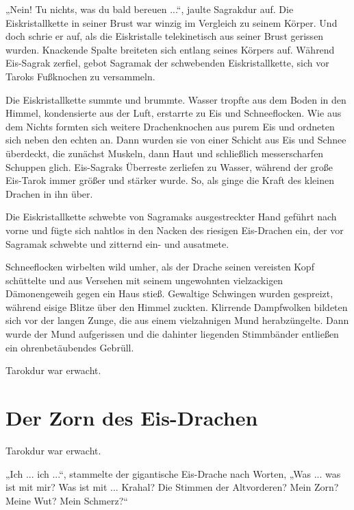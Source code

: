„Nein! Tu nichts, was du bald bereuen ...“, jaulte Sagrakdur auf. Die Eiskristallkette in seiner Brust war winzig im Vergleich zu seinem Körper. Und doch schrie er auf, als die Eiskristalle telekinetisch aus seiner Brust gerissen wurden. Knackende Spalte breiteten sich entlang seines Körpers auf. Während Eis-Sagrak zerfiel, gebot Sagramak der schwebenden Eiskristallkette, sich vor Taroks Fußknochen zu versammeln.

Die Eiskristallkette summte und brummte. Wasser tropfte aus dem Boden in den Himmel, kondensierte aus der Luft, erstarrte zu Eis und Schneeflocken. Wie aus dem Nichts formten sich weitere Drachenknochen aus purem Eis und ordneten sich neben den echten an. Dann wurden sie von einer Schicht aus Eis und Schnee überdeckt, die zunächst Muskeln, dann Haut und schließlich messerscharfen Schuppen glich. Eis-Sagraks Überreste zerliefen zu Wasser, während der große Eis-Tarok immer größer und stärker wurde. So, als ginge die Kraft des kleinen Drachen in ihn über.

Die Eiskristallkette schwebte von Sagramaks ausgestreckter Hand geführt nach vorne und fügte sich nahtlos in den Nacken des riesigen Eis-Drachen ein, der vor Sagramak schwebte und zitternd ein- und ausatmete.

Schneeflocken wirbelten wild umher, als der Drache seinen vereisten Kopf schüttelte und aus Versehen mit seinem ungewohnten vielzackigen Dämonengeweih gegen ein Haus stieß. Gewaltige Schwingen wurden gespreizt, während eisige Blitze über den Himmel zuckten. Klirrende Dampfwolken bildeten sich vor der langen Zunge, die aus einem vielzahnigen Mund herabzüngelte. Dann wurde der Mund aufgerissen und die dahinter liegenden Stimmbänder entließen ein ohrenbetäubendes Gebrüll.

Tarokdur war erwacht.


















\newpage
\section{Der Zorn des Eis-Drachen}




Tarokdur war erwacht.

„Ich ... ich ...“, stammelte der gigantische Eis-Drache nach Worten, „Was ... was ist mit mir? Was ist mit ... Krahal? Die Stimmen der Altvorderen? Mein Zorn? Meine Wut? Mein Schmerz?“

